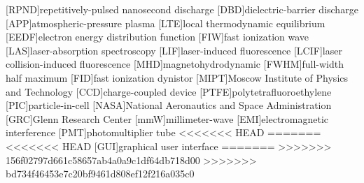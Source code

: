 [RPND]{repetitively-pulsed nanosecond discharge}
[DBD]{dielectric-barrier discharge}
[APP]{atmospheric-pressure plasma}
[LTE]{local thermodynamic equilibrium}
[EEDF]{electron energy distribution function}
[FIW]{fast ionization wave}
[LAS]{laser-absorption spectroscopy}
[LIF]{laser-induced fluorescence}
[LCIF]{laser collision-induced fluorescence}
[MHD]{magnetohydrodynamic}
[FWHM]{full-width half maximum}
[FID]{fast ionization dynistor}
[MIPT]{Moscow Institute of Physics and Technology}
[CCD]{charge-coupled device}
[PTFE]{polytetrafluoroethylene}
[PIC]{particle-in-cell}
[NASA]{National Aeronautics and Space Administration}
[GRC]{Glenn Research Center}
[mmW]{millimeter-wave}
[EMI]{electromagnetic interference}
[PMT]{photomultiplier tube}
<<<<<<< HEAD
=======
<<<<<<< HEAD
[GUI]{graphical user interface}
=======
>>>>>>> 156f02797d661c58657ab4a0a9c1df64db718d00
>>>>>>> bd734f46453e7c20bf9461d808ef12f216a035c0

